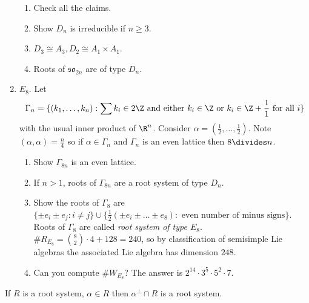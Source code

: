 \documentclass[a4paper]{article}
\newcommand*{\Lie}[1]{\mathfrak{#1}} %
\begin{document}
\begin{enumerate}
  \begin{ex}\leavevmode
    \begin{enumerate}
    \item Check all the claims.
    \item Show \(D_n\) is irreducible if \(n \geq 3\).
    \item \(D_3 \cong A_3, D_2 \cong A_1 \times A_1\).
    \item Roots of \(\Lie{so}_{2n}\) are of type \(D_n\).
    \end{enumerate}
  \end{ex}
\item \(E_8\). Let
  \[
    \Gamma_n = \{(k_1, \dots, k_n): \sum k_i \in 2\Z \text{ and either } k_i \in \Z \text{ or } k_i \in \Z + \frac{1}{1} \text{ for all } i\}
  \]
  with the usual inner product of \(\R^n\). Consider \(\alpha = (\frac{1}{2}, \dots, \frac{1}{2})\). Note \((\alpha, \alpha) = \frac{n}{4}\) so if \(\alpha \in \Gamma_n\) and \(\Gamma_n\) is an even lattice then \(8 \divides n\).

  \begin{ex}\leavevmode
    \begin{enumerate}
    \item Show \(\Gamma_{8n}\) is an even lattice.
    \item If \(n >1\), roots of \(\Gamma_{8n}\) are a root system of type \(D_n\).
    \item Show the roots of \(\Gamma_8\) are \(\{\pm e_i \pm e_j: i \neq j\} \cup \{\frac{1}{2}(\pm e_i  \pm \dots \pm e_8): \text{ even number of minus signs}\}\). Roots of \(\Gamma_8\) are called \emph{root system of type \(E_8\)}. \(\# R_{E_8} = \binom{8}{2} \cdot 4 + 128 = 240\), so by classification of semisimple Lie algebras the associated Lie algebra has dimension \(248\).
    \item Can you compute \(\# W_{E_8}\)? The answer is \(2^{14} \cdot 3^5 \cdot 5^2 \cdot 7\).
    \end{enumerate}
  \end{ex}
\end{enumerate}

\begin{ex}
  If \(R\) is a root system, \(\alpha \in R\) then \(\alpha^\perp \cap R \) is a root system.
\end{ex}













\printindex
\end{document}
